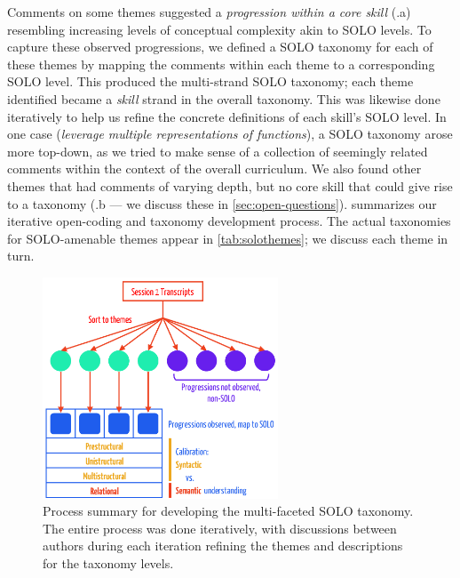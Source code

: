 Comments on some themes suggested a \emph{progression within a core skill} (.a) resembling increasing levels of conceptual complexity akin to SOLO levels.
To capture these observed progressions, we defined a SOLO taxonomy for each of these themes by mapping the comments within each theme to a corresponding SOLO level. This produced the multi-strand SOLO taxonomy; each theme identified became a \emph{skill} strand in the overall taxonomy. This was likewise done iteratively to help us refine the concrete definitions of each skill's SOLO level. In one case (\emph{leverage multiple representations of functions}), a SOLO taxonomy arose more top-down, as we tried to make sense of a collection of seemingly related comments within the context of the overall curriculum. We also found other themes that had comments of varying depth, but no core skill that could give rise to a taxonomy (.b --- we discuss these in \cref{sec:open-questions}).  summarizes our iterative open-coding and taxonomy development process. The actual taxonomies for SOLO-amenable themes appear in \cref{tab:solothemes}; we discuss each theme in turn.

\begin{figure}
\includegraphics[width=7cm]{process-summary}
\caption{Process summary for developing the multi-faceted SOLO taxonomy. The entire process was done iteratively, with discussions between authors during each iteration refining the themes and descriptions for the taxonomy levels.}
\label{fig:process}
\end{figure}


